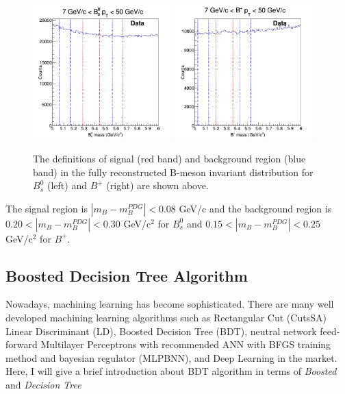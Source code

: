 \begin{figure}[h]
\begin{center}
\includegraphics[width= 0.48\textwidth]{Figures/Chapter5/BsData.png}
\includegraphics[width= 0.48\textwidth]{Figures/Chapter5/BPData.png}
\caption{The definitions of signal (red band) and background region (blue band) in the fully reconstructed B-meson invariant distribution for $B^0_s$ (left) and $B^+$ (right) are shown above.}
\label{SigBackRegion}
\end{center}
\end{figure}

The signal region is $|m_B - m_B^{PDG}| < 0.08$ GeV/c and the background region is $0.20 < |m_B - m_B^{PDG}| < 0.30$ GeV/c$^2$ for $B^0_s$ and $0.15 < |m_B - m_B^{PDG}| < 0.25$ GeV/c$^2$  for $B^+$.


\subsection{Boosted Decision Tree Algorithm}

Nowadays, machining learning has become sophisticated. There are many well developed machining learning algorithms such as Rectangular Cut (CutsSA) Linear Discriminant (LD), Boosted Decision Tree (BDT), neutral network feed-forward Multilayer Perceptrons with recommended ANN with BFGS training method and bayesian regulator (MLPBNN), and Deep Learning in the market. Here, I will give a brief introduction about BDT algorithm in terms of \textit{Boosted} and \textit{Decision Tree}

